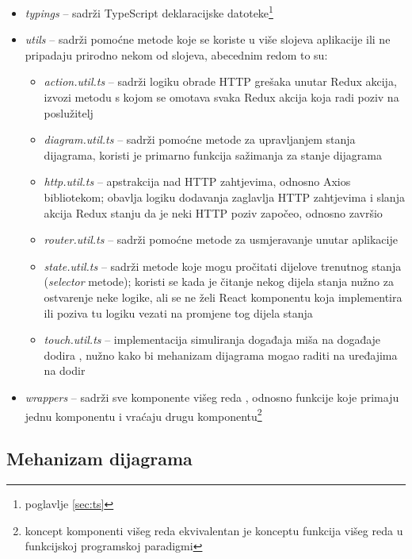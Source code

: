 \documentclass[times, utf8, diplomski, numeric]{fer}
\newcommand{\razmaks}{\vspace{10pt}}
\begin{document}
\begin{itemize}
    \item \emph{typings} -- sadrži TypeScript deklaracijske datoteke\footnote{poglavlje \ref{sec:ts}}
    \item \emph{utils} -- sadrži pomoćne metode koje se koriste u više slojeva aplikacije ili ne pripadaju prirodno nekom od slojeva, abecednim redom to su:
    \begin{itemize}
        \item \emph{action.util.ts} -- sadrži logiku obrade HTTP grešaka unutar Redux akcija, izvozi metodu s kojom se omotava svaka Redux akcija koja radi poziv na poslužitelj
        \item \emph{diagram.util.ts} -- sadrži pomoćne metode za upravljanjem stanja dijagrama, koristi je primarno funkcija sažimanja  za stanje dijagrama
        \item \emph{http.util.ts} -- apstrakcija nad HTTP zahtjevima, odnosno Axios bibliotekom; obavlja logiku dodavanja zaglavlja HTTP zahtjevima i slanja  akcija Redux stanju da je neki HTTP poziv započeo, odnosno završio
        \item \emph{router.util.ts} -- sadrži pomoćne metode za usmjeravanje unutar aplikacije
        \item \emph{state.util.ts} -- sadrži metode koje mogu pročitati dijelove trenutnog stanja (\emph{selector} metode); koristi se kada je čitanje nekog dijela stanja nužno za ostvarenje neke logike, ali se ne želi React komponentu koja implementira ili poziva tu logiku vezati  na promjene tog dijela stanja
        \item \emph{touch.util.ts} -- implementacija simuliranja događaja miša  na događaje dodira , nužno kako bi mehanizam dijagrama mogao raditi na uređajima na dodir
    \end{itemize}
    \item \emph{wrappers} -- sadrži sve komponente višeg reda , odnosno funkcije koje primaju jednu komponentu i vraćaju drugu komponentu\footnote{
        koncept komponenti višeg reda ekvivalentan je konceptu funkcija višeg reda u funkcijskoj programskoj paradigmi
    }
\end{itemize}
\razmaks

\newpage
\subsection{Mehanizam dijagrama} \label{sec:diagram}
\end{document}
